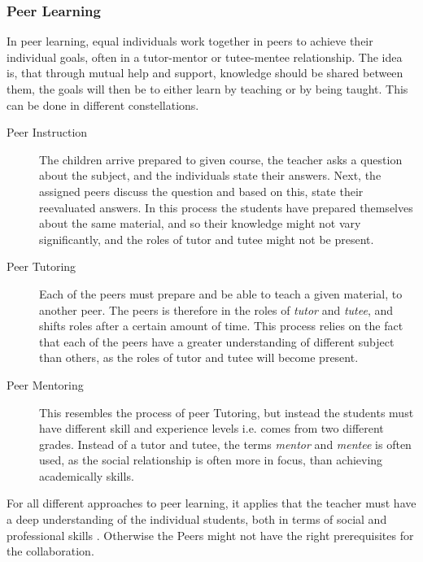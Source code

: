 \subsubsection{Peer Learning} %
In peer learning, equal individuals work together in peers to achieve their individual goals\cite{peerLearning}, often in a tutor-mentor or tutee-mentee relationship. The idea is, that through mutual help and support, knowledge should be shared between them, the goals will then be to either learn by teaching or by being taught. This can be done in different constellations\cite{collaborationCompetition}.

\begin{description}
	\item[Peer Instruction] The children arrive prepared to given course, the teacher asks a question about the subject, and the individuals state their answers. Next, the assigned peers discuss the question and based on this, state their reevaluated answers. In this process the students have prepared themselves about the same material, and so their knowledge might not vary significantly, and the roles of tutor and tutee might not be present.\\
	
	\item[Peer Tutoring] Each of the peers must prepare and be able to teach a given material, to another peer. The peers is therefore in the roles of \textit{tutor} and \textit{tutee}, and shifts roles after a certain amount of time. This process relies on the fact that each of the peers have a greater understanding of different subject than others, as the roles of tutor and tutee will become present.\\
	
	\item[Peer Mentoring] This resembles the process of peer Tutoring, but instead the students must have different skill and experience levels i.e. comes from two different grades. Instead of a tutor and tutee, the terms \textit{mentor} and \textit{mentee} is often used, as the social relationship is often more in focus, than achieving academically skills.\\
\end{description}   

For all different approaches to peer learning, it applies that the teacher must have a deep understanding of the individual students, both in terms of social and professional skills \cite{collaborationCompetition}. Otherwise the Peers might not have the right prerequisites for the collaboration\cite{collaborationCompetition}.


